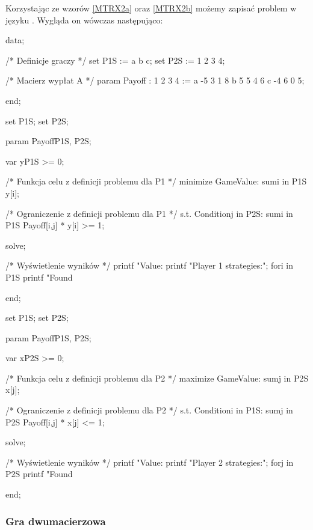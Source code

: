 \documentclass[polish]{standalone}
\begin{document}
Korzystając ze wzorów \ref{MTRX2a} oraz \ref{MTRX2b} możemy zapisać problem w języku . Wygląda on
wówczas następująco:

\begin{mathprog}[caption=Przykładowe dane]
data;

/* Definicje graczy */
set P1S := a b c;
set P2S := 1 2 3 4;

/* Macierz wypłat A */
param Payoff
    :  1  2  3  4 :=
    a -5  3  1  8
    b  5  5  4  6
    c -4  6  0  5;
 
end;
\end{mathprog}

\begin{mathprog}[caption=Rozwiązanie dla gracza pierwszego]
set P1S;
set P2S;

param Payoff{P1S, P2S};

var y{P1S} >= 0;

/* Funkcja celu z definicji problemu dla P1 */
minimize GameValue: sum{i in P1S} y[i];

/* Ograniczenie z definicji problemu dla P1 */
s.t. Condition{j in P2S}:
    sum{i in P1S} Payoff[i,j] * y[i] >= 1;

solve;

/* Wyświetlenie wyników */
printf "Value: %
printf "Player 1 strategies:\n";
for{i in P1S}
    printf "Found %

end;
\end{mathprog}

\begin{mathprog}[caption=Rozwiązanie dla gracza drugiego]
set P1S;
set P2S;

param Payoff{P1S, P2S};

var x{P2S} >= 0;

/* Funkcja celu z definicji problemu dla P2 */
maximize GameValue: sum{j in P2S} x[j];

/* Ograniczenie z definicji problemu dla P2 */
s.t. Condition{i in P1S}:
    sum{j in P2S} Payoff[i,j] * x[j] <= 1;

solve;

/* Wyświetlenie wyników */
printf "Value: %
printf "Player 2 strategies:\n";
for{j in P2S}
    printf "Found %
 
end;
\end{mathprog}

\subsubsection{Gra dwumacierzowa}
\end{document}
